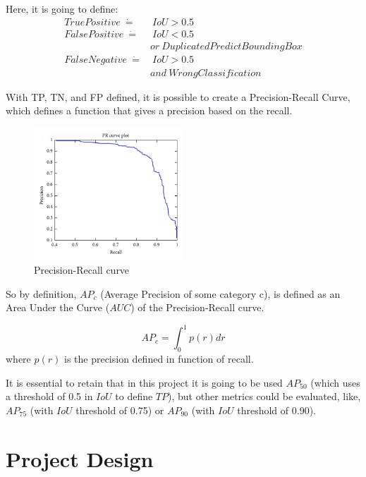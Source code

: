\documentclass[11pt, a4paper, twocolumn]{article}
\begin{document}
Here, it is going to define:
\begin{align*}
TruePositive\ \dot=&\ IoU > 0.5 \\
FalsePositive\ \dot=&\ IoU < 0.5 \\
         &or\ Duplicated PredictBoundingBox \\
FalseNegative\ \dot=&\ IoU > 0.5\ \\ 
&and \ WrongClassification
\end{align*}

With TP, TN, and FP defined, it is possible to create a Precision-Recall Curve, which defines a function that gives a precision based on the recall.

\begin{figure}[ht]
	
	\centering
	\includegraphics[width=0.5\textwidth]{precision-recall.png}
	\caption{\scriptsize Precision-Recall curve \cite{medium:1}}
	
\end{figure}

So by definition, $AP_c$ (Average Precision of some category c), is defined as an Area Under the Curve ($AUC$) of the Precision-Recall curve.

{\centering
\begin{equation*}
AP_c = \int_{0}^{1} p(r) dr
\end{equation*}
where $p(r)$ is the precision defined in function of recall.}

It is essential to retain that in this project it is going to be used $AP_{50}$ (which uses a threshold of 0.5 in $IoU$ to define $TP$), but other metrics could be evaluated, like, $AP_{75}$ (with $IoU$ threshold of 0.75) or $AP_{90}$ (with $IoU$ threshold of 0.90).

\section{Project Design}
\end{document}
